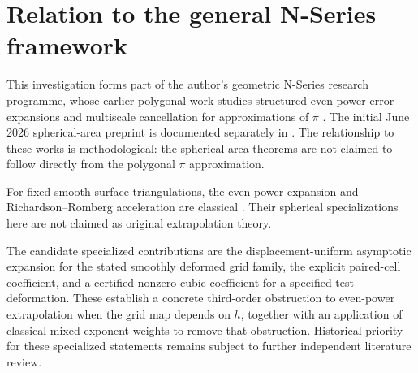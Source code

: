 \documentclass[11pt]{article}
\theoremstyle{remark}
\begin{document}
\section{Relation to the general N-Series framework}
This investigation forms part of the author's geometric N-Series research programme,
whose earlier polygonal work studies structured even-power error expansions and
multiscale cancellation for approximations of $\pi$
\cite{baker2026pi,baker2026scaling}. The initial June 2026 spherical-area
preprint is documented separately in \cite{baker2026spherical}. The
relationship to these works is methodological: the spherical-area theorems
are not claimed to follow directly from the polygonal $\pi$ approximation.

For fixed smooth surface triangulations, the even-power expansion and
Richardson--Romberg acceleration are classical
\cite{georg91,georgtausch,verlindencools,lyness94}. Their spherical
specializations here are not claimed as original extrapolation theory.

The candidate specialized contributions are the displacement-uniform
asymptotic expansion for the stated smoothly deformed grid family,
the explicit paired-cell coefficient, and a certified nonzero cubic
coefficient for a specified test deformation. These establish a concrete
third-order obstruction to even-power extrapolation when the grid map
depends on $h$, together with an application of classical mixed-exponent
weights to remove that obstruction. Historical priority for these specialized
statements remains subject to further independent literature review.

\end{document}
